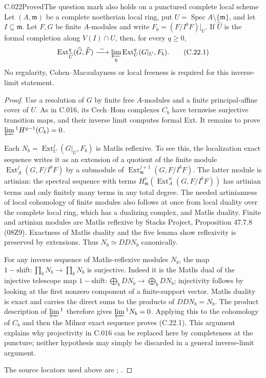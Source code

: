 \begin{saresult}{C.022}{Proved}{The question mark also holds on a punctured complete local scheme}
Let $(A,\mathfrak m)$ be a complete noetherian local ring, put
$U=\operatorname{Spec}A\setminus\{\mathfrak m\}$, and let
$I\subseteq\mathfrak m$. Let $F,G$ be finite $A$-modules and
write $F_b=(F/I^bF)|_U$. If $\widehat U$ is the formal
completion along $V(I)\cap U$, then, for every $q\geq0$,
\[
 \operatorname{Ext}^q_{\widehat U}(\widehat G,\widehat F)
 \xrightarrow{\ \sim\ }
 \varprojlim_b\operatorname{Ext}^q_U(G|_U,F_b).
 \tag{C.22.1}
\]
No regularity, Cohen--Macaulayness or local freeness is required
for this inverse-limit statement.
\end{saresult}
\begin{proof}
Use a resolution of $G$ by finite free $A$-modules and a finite
principal-affine cover of $U$. As in C.016, its Cech--Hom
complexes $C_b$ have termwise surjective transition maps, and
their inverse limit computes formal Ext. It remains to prove
$\varprojlim{}^1H^{q-1}(C_b)=0$.

Each $N_b=\operatorname{Ext}^j_U(G|_U,F_b)$ is Matlis reflexive.
To see this, the localization exact sequence writes it as an
extension of a quotient of the finite module
$\operatorname{Ext}^j_A(G,F/I^bF)$ by a submodule of
$\operatorname{Ext}^{j+1}_{\mathfrak m}(G,F/I^bF)$.
The latter module is artinian: the spectral sequence with terms
$H^v_{\mathfrak m}(\operatorname{Ext}^w_A(G,F/I^bF))$ has
artinian terms and only finitely many terms in any total degree.
The needed artinianness of local cohomology of finite modules
also follows at once from local duality over the complete local
ring, which has a dualizing complex, and Matlis duality.
Finite and artinian modules are Matlis reflexive by Stacks
Project, Proposition 47.7.8 (08Z9). Exactness of Matlis duality
and the five lemma show reflexivity is preserved by extensions.
Thus $N_b\simeq DDN_b$ canonically.

For any inverse sequence of Matlis-reflexive modules $N_b$, the
map $1-\mathrm{shift}:\prod_bN_b\to\prod_bN_b$ is surjective.
Indeed it is the Matlis dual of the injective telescope map
$1-\mathrm{shift}:\bigoplus_bDN_b\to\bigoplus_bDN_b$;
injectivity follows by looking at the first nonzero component
of a finite-support vector. Matlis duality is exact and carries
the direct sums to the products of $DDN_b=N_b$.
The product description of $\varprojlim{}^1$ therefore gives
$\varprojlim{}^1N_b=0$. Applying this to the cohomology of $C_b$
and then the Milnor exact sequence proves (C.22.1).
This argument explains why projectivity in C.016 can be replaced
here by completeness at the puncture; neither hypothesis may
simply be discarded in a general inverse-limit argument.

The source locators used above are \cite[47.7.8]{C-stacks}; \cite[XIII, Section~1 after Problem~1.4, p.~139]{C-sga2}.
\end{proof}

